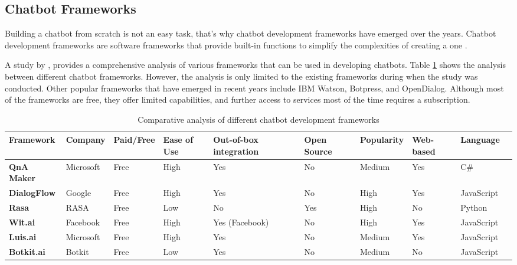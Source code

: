 \subsection{Chatbot Frameworks}

Building a chatbot from scratch is not an easy task, that’s why chatbot development frameworks have emerged over the years. Chatbot development frameworks are software frameworks that provide built-in functions to simplify the complexities of creating a one \cite{geekforgeeks2024}. 

A study by \cite{omaima2020}, provides a comprehensive analysis of various frameworks that can be used in developing chatbots. Table \ref{Tab: framework_comparison} shows the analysis between different chatbot frameworks. However, the analysis is only limited to the existing frameworks during when the study was conducted. Other popular frameworks that have emerged in recent years include IBM Watson, Botpress, and OpenDialog. Although most of the frameworks are free, they offer limited capabilities, and further access to services most of the time requires a subscription.

\begin{table}
	\renewcommand{\arraystretch}{1.5}
	\begin{adjustbox}{max width=\textwidth}
		\begin{tabular}{|p{2.6cm}|p{2.1cm}|p{2cm}|p{2.1cm}|p{2.4cm}|p{2cm}|p{2cm}|p{2cm}|p{2cm}|p{2.3cm}|}
			\hline
			\textbf{Framework} 
			& \textbf{Company} 
			& \textbf{Paid/Free} 
			& \textbf{Ease of Use} 
			& \textbf{Out-of-box integration} 
			& \textbf{Open Source} 
			& \textbf{Popularity} 
			& \textbf{Web-based} 
			& \textbf{Language} 
			\\ \hline
			\textbf{QnA Maker} 
			& Microsoft 
			& Free 
			& High 
			& Yes 
			& No 
			& Medium 
			& Yes 
			& C\# 
			\\ \hline
			\textbf{DialogFlow} 
			& Google 
			& Free 
			& High 
			& Yes 
			& No 
			& High 
			& Yes 
			& JavaScript 
			\\ \hline
			\textbf{Rasa} 
			& RASA 
			& Free 
			& Low 
			& No 
			& Yes 
			& High 
			& No 
			& Python 
			\\ \hline
			\textbf{Wit.ai} 
			& Facebook 
			& Free 
			& High 
			& Yes (Facebook) 
			& No 
			& High 
			& Yes 
			& JavaScript 
			\\
			\hline
			\textbf{Luis.ai} 
			& Microsoft 
			& Free 
			& High 
			& Yes 
			& No 
			& Medium 
			& Yes 
			& JavaScript 
			\\
			\hline
			\textbf{Botkit.ai} 
			& Botkit 
			& Free 
			& Low 
			& Yes 
			& No 
			& Medium 
			& No 
			& JavaScript 
			\\
			\hline
		\end{tabular}
	\end{adjustbox}
	\caption{Comparative analysis of different chatbot development frameworks}
	\label{Tab: framework_comparison}
\end{table}

